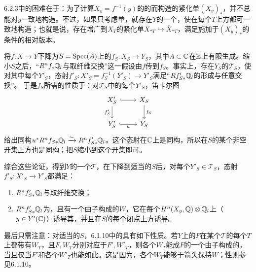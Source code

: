 6.2.3中的困难在于：为了计算$X_y=f^{-1}(y)$的的而构造的紧化单$(X_y)_*$，并不总能对$y$一致地构造。不过，如果只考虑单，就存在$Y$的一个，使在每个$T$上方都可一致地构造；也就是说，存在增广到$X_T$的紧化单$X_{*T}\hookrightarrow\overline X_{*T}$，满足施加于$(X_y)_*$的条件的相对版本。

将$f:X\to Y$下降为$S=\operatorname{Spec}(A)$上的$f_S:X_S\to Y_S$，其中$A\subset\mathbb C$在$\mathbb Z$上有限生成。缩小$S$之后，“$R^nf_*\mathbb Q_l$与取纤维交换”这一假设由$f$传到$f_S$。事实上，存在$Y_S$的$\mathcal T_S$，使对其中每个$Y'_S$，态射$f'_S:X'_S=f_S^{-1}(Y'_S)\to Y'_S$满足“$Rf'_{S*}\mathbb Q_l$的形成与任意交换”。
于是$f_S$所需的性质于：对$\mathcal T_S$中的每个$Y'_S$，笛卡尔图
\[
\begin{tikzcd}[ampersand replacement=\&]
X'_S\arrow[r,hook]\arrow[d,"{f'_S}"']\&X_S\arrow[d,"{f_S}"]\\
Y'_S\arrow[r,hook,"{u}"']\&Y_S
\end{tikzcd}
\]
给出同构$u^*R^nf_{S*}\mathbb Q_l\xrightarrow{\sim}R^nf'_{S*}\mathbb Q_l$。这个态射在$\mathbb C$上是同构，所以在$S$的某个非空开集上方也是同构；把$S$缩小到这个开集即可。

综合这些论证，得到$Y$的一个$\mathcal T$，在下降到适当的$S$后，对每个$Y'_S\in\mathcal T_S$，态射$f'_S:X'_S\to Y'_S$都满足：
\begin{enumerate}[label=\alph*)]
\item $R^nf'_{S*}\mathbb Q_l$与取纤维交换；
\item $R^nf'_{S*}\mathbb Q_l$为，且有一个由子构成的$W$，它在每个$H^n(X_y,\mathbb Q)\otimes\mathbb Q_l$上（$y\in Y'(\mathbb C)$）诱导其，并且在$S$的每个闭点上方诱导。
\end{enumerate}
最后只需注意：对适当的$S$，6.1.10中的具有如下性质。若$Y$上的$F$在某个$\mathcal T$的每个$T$上都带有$W_T$，且$F,W_T$分别对应于$F',W'_T$，则各个$W_T$能成$F$的一个由子构成的，当且仅当$F'$和各个$W'_T$也能如此。这是因为，各个$W_T$能够于箭头保持$W$；性则参见6.1.10。

